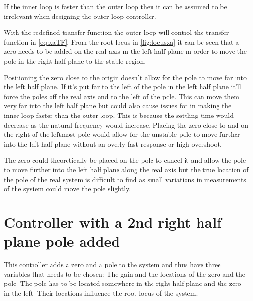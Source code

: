 If the inner loop is faster than the outer loop then it can be assumed to be irrelevant when designing the outer loop controller.

With the redefined transfer function the outer loop will control the transfer function in \autoref{eq:xaTF}. From the root locus in \autoref{fig:locusxa} it can be seen that a zero needs to be added on the real axis in the left half plane in order to move the pole in the right half plane to the stable region. 

Positioning the zero close to the origin doesn't allow for the pole to move far into the left half plane. If it's put far to the left of the pole in the left half plane it'll force the poles off the real axis and to the left of the pole. This can move them very far into the left half plane but could also cause issues for in making the inner loop faster than the outer loop. This is because the settling time would decrease as the natural frequency would increase. Placing the zero close to and on the right of the leftmost pole would allow for the unstable pole to move further into the left half plane without an overly fast response or high overshoot. 

The zero could theoretically be placed on the pole to cancel it and allow the pole to move further into the left half plane along the real axis but the true location of the pole of the real system is difficult to find as small variations in measurements of the system could move the pole slightly.



\section{Controller with a 2nd right half plane pole added}
This controller adds a zero and a pole to the system and thus have three variables that needs to be chosen: The gain and the locations of the zero and the pole. The pole has to be located somewhere in the right half plane and the zero in the left. Their locations influence the root locus of the system.

